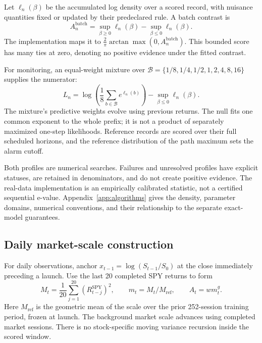 Let $\ell_n(\beta)$ be the accumulated log density over a scored record,
with nuisance quantities fixed or updated by their predeclared rule. A batch
contrast is
\begin{equation}\label{eq:batch}
 A_n^{\mathrm{batch}}=\sup_{\beta\geq0}\ell_n(\beta)
                         -\sup_{\beta\leq0}\ell_n(\beta).
\end{equation}
The implementation maps it to $\frac2\pi\arctan\max(0,A_n^{\mathrm{batch}})$.
This bounded score has many ties at zero, denoting no positive evidence
under the fitted contrast.

For monitoring, an equal-weight mixture over
$\mathcal B=\{1/8,1/4,1/2,1,2,4,8,16\}$ supplies the numerator:
\begin{equation}\label{eq:monitor}
 L_n=\log\left(\frac18\sum_{b\in\mathcal B}e^{\ell_n(b)}\right)
                    -\sup_{\beta\leq0}\ell_n(\beta).
\end{equation}
The mixture's predictive weights evolve using previous returns. The null
fits one common exponent to the whole prefix; it is not a product of
separately maximized one-step likelihoods. Reference records are scored over
their full scheduled horizons, and the reference distribution of the path
maximum sets the alarm cutoff.

Both profiles are numerical searches. Failures and unresolved profiles have
explicit statuses, are retained in denominators, and do not create positive
evidence. The real-data implementation is an empirically calibrated
statistic, not a certified sequential e-value. Appendix~\ref{app:algorithms}
gives the density, parameter domains, numerical conventions, and their
relationship to the separate exact-model guarantees.

\subsection{Daily market-scale construction}\label{sec:dailyconstruction}
For daily observations, anchor $x_{t-1}=\log(S_{t-1}/S_0)$ at the close
immediately preceding a launch. Use the last 20 completed SPY returns to form
\begin{equation}\label{eq:marketscale}
 M_t=\frac1{20}\sum_{j=1}^{20}(R^{\mathrm{SPY}}_{t-j})^2,
 \qquad m_t=M_t/M_{\mathrm{ref}},
 \qquad A_t=w m_t^g.
\end{equation}
Here $M_{\mathrm{ref}}$ is the geometric mean of the scale over the prior
252-session training period, frozen at launch. The background market scale
advances using completed market sessions. There is no stock-specific moving
variance recursion inside the scored window.

